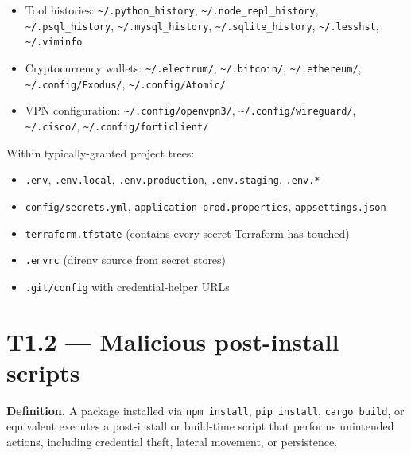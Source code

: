 \begin{itemize}
  \texttt{\textasciitilde{}/.zsh\_history},
  \texttt{\textasciitilde{}/.fish\_history},
  \texttt{\textasciitilde{}/.local/share/fish/fish\_history}
\item
  Tool histories: \texttt{\textasciitilde{}/.python\_history},
  \texttt{\textasciitilde{}/.node\_repl\_history},
  \texttt{\textasciitilde{}/.psql\_history},
  \texttt{\textasciitilde{}/.mysql\_history},
  \texttt{\textasciitilde{}/.sqlite\_history},
  \texttt{\textasciitilde{}/.lesshst},
  \texttt{\textasciitilde{}/.viminfo}
\item
  Cryptocurrency wallets: \texttt{\textasciitilde{}/.electrum/},
  \texttt{\textasciitilde{}/.bitcoin/},
  \texttt{\textasciitilde{}/.ethereum/},
  \texttt{\textasciitilde{}/.config/Exodus/},
  \texttt{\textasciitilde{}/.config/Atomic/}
\item
  VPN configuration: \texttt{\textasciitilde{}/.config/openvpn3/},
  \texttt{\textasciitilde{}/.config/wireguard/},
  \texttt{\textasciitilde{}/.cisco/},
  \texttt{\textasciitilde{}/.config/forticlient/}
\end{itemize}

Within typically-granted project trees:

\begin{itemize}
\tightlist
\item
  \texttt{.env}, \texttt{.env.local}, \texttt{.env.production},
  \texttt{.env.staging}, \texttt{.env.*}
\item
  \texttt{config/secrets.yml}, \texttt{application-prod.properties},
  \texttt{appsettings.json}
\item
  \texttt{terraform.tfstate} (contains every secret Terraform has
  touched)
\item
  \texttt{.envrc} (direnv source from secret stores)
\item
  \texttt{.git/config} with credential-helper URLs
\end{itemize}

\hypertarget{t1.2-malicious-post-install-scripts}{%
\section{T1.2 --- Malicious post-install
scripts}\label{t1.2-malicious-post-install-scripts}}

\textbf{Definition.} A package installed via \texttt{npm\ install},
\texttt{pip\ install}, \texttt{cargo\ build}, or equivalent executes a
post-install or build-time script that performs unintended actions,
including credential theft, lateral movement, or persistence.

